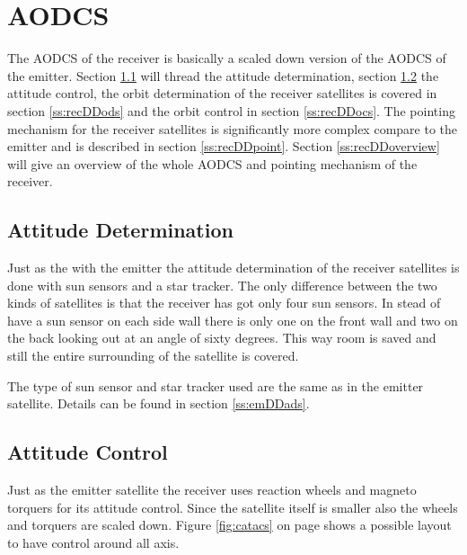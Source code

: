 \section{\acl{AODCS}}
\label{recDDadcs}
The \ac{AODCS} of the receiver is basically a scaled down version of the \ac{AODCS} of the emitter. Section \ref{ss:recDDads} will thread the attitude determination, section \ref{ss:recDDacs} the attitude control, the orbit determination of the receiver satellites is covered in section \ref{ss:recDDods} and the orbit control in section \ref{ss:recDDocs}. The pointing mechanism for the receiver satellites is significantly more complex compare to the emitter and is described in section \ref{ss:recDDpoint}. Section \ref{ss:recDDoverview} will give an overview of the whole \ac{AODCS} and pointing mechanism of the receiver.
\subsection{Attitude Determination}
\label{ss:recDDads}
Just as the with the emitter the attitude determination of the receiver satellites is done with sun sensors and a star tracker. The only difference between the two kinds of satellites is that the receiver has got only four sun sensors. In stead of have a sun sensor on each side wall there is only one on the front wall and two on the back looking out at an angle of sixty degrees. This way room is saved and still the entire surrounding of the satellite is covered.

The type of sun sensor and star tracker used are the same as in the emitter satellite. Details can be found in section \ref{ss:emDDads}.

\subsection{Attitude Control}
\label{ss:recDDacs}
Just as the emitter satellite the receiver uses reaction wheels and magneto torquers for its attitude control. Since the satellite itself is smaller also the wheels and torquers are scaled down. Figure \ref{fig:catacs} on page \pageref{fig:catacs} shows a possible layout to have control around all axis.

